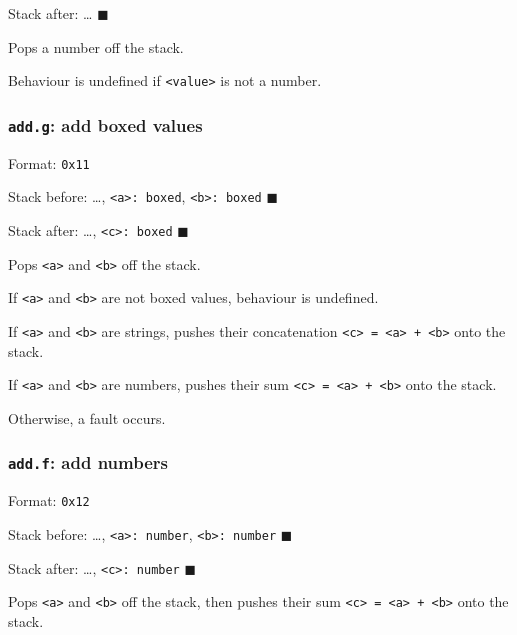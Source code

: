 Stack after: \ldots{} \(\blacksquare\)

Pops a number off the stack.

Behaviour is undefined if \texttt{\textless{}value\textgreater{}} is not
a number.

\subsubsection{\texorpdfstring{\texttt{add.g}: add boxed
values}{add.g: add boxed values}}

Format: \texttt{0x11}

Stack before: \ldots, \texttt{\textless{}a\textgreater{}:\ boxed},
\texttt{\textless{}b\textgreater{}:\ boxed} \(\blacksquare\)

Stack after: \ldots, \texttt{\textless{}c\textgreater{}:\ boxed}
\(\blacksquare\)

Pops \texttt{\textless{}a\textgreater{}} and
\texttt{\textless{}b\textgreater{}} off the stack.

If \texttt{\textless{}a\textgreater{}} and
\texttt{\textless{}b\textgreater{}} are not boxed values, behaviour is
undefined.

If \texttt{\textless{}a\textgreater{}} and
\texttt{\textless{}b\textgreater{}} are strings, pushes their
concatenation
\texttt{\textless{}c\textgreater{}\ =\ \textless{}a\textgreater{}\ +\ \textless{}b\textgreater{}}
onto the stack.

If \texttt{\textless{}a\textgreater{}} and
\texttt{\textless{}b\textgreater{}} are numbers, pushes their sum
\texttt{\textless{}c\textgreater{}\ =\ \textless{}a\textgreater{}\ +\ \textless{}b\textgreater{}}
onto the stack.

Otherwise, a fault occurs.

\subsubsection{\texorpdfstring{\texttt{add.f}: add
numbers}{add.f: add numbers}}

Format: \texttt{0x12}

Stack before: \ldots, \texttt{\textless{}a\textgreater{}:\ number},
\texttt{\textless{}b\textgreater{}:\ number} \(\blacksquare\)

Stack after: \ldots, \texttt{\textless{}c\textgreater{}:\ number}
\(\blacksquare\)

Pops \texttt{\textless{}a\textgreater{}} and
\texttt{\textless{}b\textgreater{}} off the stack, then pushes their sum
\texttt{\textless{}c\textgreater{}\ =\ \textless{}a\textgreater{}\ +\ \textless{}b\textgreater{}}
onto the stack.

